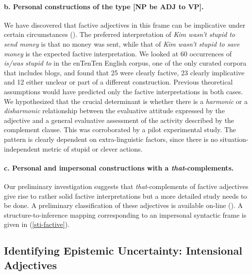 \documentclass[10pt]{article}
\begin{document}
\vspace{-.2in}
\paragraph{b. Personal constructions of the type [NP be ADJ to VP].}
We have discovered that factive adjectives in this frame can be implicative under certain circumstances (\cite{csli-gang-cssp13}). 
The preferred interpretation of \textit{Kim wasn't stupid to send money} is that no money was sent, while that of \textit{Kim wasn't stupid to save money} is the expected factive interpretation. We looked at 60 occurrences of \textit{is/was stupid to} in the enTenTen English corpus, one of the only curated corpora that includes blogs, and found that 25 were clearly factive, 23 clearly implicative and 12 either unclear or part of a different construction. Previous theoretical assumptions would have predicted only the factive interpretations in both cases. We hypothesized that the crucial determinant is whether there is a \emph{harmonic} or a \emph{disharmonic} relationship between the evaluative attitude expressed by the adjective and a general  evaluative assessment of the activity described by the complement clause.  
This  was corroborated by a pilot experimental study. The  pattern is clearly dependent on extra-linguistic factors, since there is no situation-independent metric of stupid or clever actions. 

\vspace{-.2in}
\paragraph{c. Personal and impersonal constructions with a \textit{that}-complements.} 
Our preliminary investigation suggests that \textit{that}-complements of factive adjectives give rise to rather solid factive interpretations but a more detailed study needs to be done.  A preliminary classification of these adjectives is available on-line (\cite{faust-adj-pol-lex}). A structure-to-inference mapping corresponding to an impersonal syntactic frame is given in (\ref{sti-factive}).
\vspace{-0.5em}
\vspace{-5mm}
\subsection{Identifying Epistemic Uncertainty: Intensional Adjectives}
\end{document}

